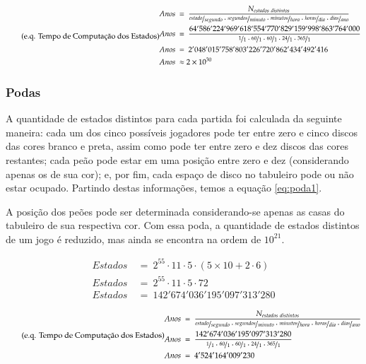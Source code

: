 \begin{equation} \label{eq:anos_estados} \tag{e.q. Tempo de Computação dos Estados}
\begin{split}
Anos\ &=\ \dfrac{N_{estados\ distintos}}{\nicefrac{estado}{segundo}\cdot\nicefrac{segundos}{minuto}\cdot\nicefrac{minutos}{hora}\cdot\nicefrac{horas}{dia}\cdot\nicefrac{dias}{ano}}\\
Anos\ &=\ \dfrac{64'586'224'969'618'554'770'829'159'998'863'764'000}{\nicefrac{1}{1}\cdot\nicefrac{60}{1}\cdot\nicefrac{60}{1}\cdot\nicefrac{24}{1}\cdot\nicefrac{365}{1}}\\
Anos\ &=\ 2'048'015'758'803'226'720'862'434'492'416\\
Anos\ &\approx 2\times10^{30}
\end{split}
\end{equation}


\subsubsection{Podas}

A quantidade de estados distintos para cada partida foi calculada da seguinte maneira: cada um dos cinco possíveis jogadores pode ter entre zero e cinco discos das cores branco e preta, assim como pode ter entre zero e dez discos das cores restantes; cada peão pode estar em uma posição entre zero e dez (considerando apenas os de sua cor); e, por fim, cada espaço de disco no tabuleiro pode ou não estar ocupado. Partindo destas informações, temos a equação \ref{eq:poda1}.

A posição dos peões pode ser determinada considerando-se apenas as casas do
tabuleiro de sua respectiva cor. Com essa poda, a quantidade de estados distintos de um jogo é reduzido, mas ainda se encontra na ordem de $10^{21}$.

\begin{equation} \label{eq:poda1} \tag{e.q. Poda por posição}
\begin{split}
Estados\ &=\ 2^{55}\cdot 11\cdot 5\cdot (5\times 10 + 2\cdot 6)\\
Estados\ &=\ 2^{55}\cdot 11\cdot 5\cdot 72\\
Estados\ &=\ 142'674'036'195'097'313'280
\end{split}
\end{equation}

\begin{equation} \label{eq:anos_estados} \tag{e.q. Tempo de Computação dos Estados}
\begin{split}
Anos\ &=\ \dfrac{N_{estados\ distintos}}{\nicefrac{estado}{segundo}\cdot\nicefrac{segundos}{minuto}\cdot\nicefrac{minutos}{hora}\cdot\nicefrac{horas}{dia}\cdot\nicefrac{dias}{ano}}\\
Anos\ &=\ \dfrac{142'674'036'195'097'313'280}{\nicefrac{1}{1}\cdot\nicefrac{60}{1}\cdot\nicefrac{60}{1}\cdot\nicefrac{24}{1}\cdot\nicefrac{365}{1}}\\
Anos\ &=\ 4'524'164'009'230
\end{split}
\end{equation}


